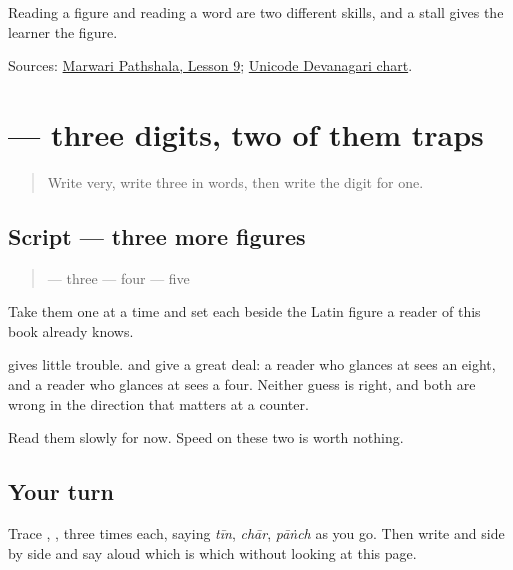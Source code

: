 Reading a figure and reading a word are two different skills, and a stall gives the learner the figure.

\begin{tcolorbox}[breakable,colback=teal!4,colframe=teal!35!black,title={Before you move on}]
Sources: \href{https://www.marwaripathshala.com/marwari-lesson-9-english}{Marwari Pathshala, Lesson 9}; \href{https://www.unicode.org/charts/PDF/U0900.pdf}{Unicode Devanagari chart}.
\end{tcolorbox}
\section[\texorpdfstring{\mw{३} \mw{४} \mw{५} (3 4 5)}{३ ४ ५ (3 4 5)}]{   — three digits, two of them traps}

\label{lesson:MW-W35-digits-three-four-five}



\begin{quote}
Write very, write three in words, then write the digit for one.
\end{quote}

\subsection*{Script — three more figures}
\begin{quote}
\textbf{} — three  \textbf{} — four  \textbf{} — five
\end{quote}

Take them one at a time and set each beside the Latin figure a reader of this book already knows.

\textbf{} gives little trouble. \textbf{} and \textbf{} give a great deal: a reader who glances at \textbf{} sees an eight, and a reader who glances at \textbf{} sees a four. Neither guess is right, and both are wrong in the direction that matters at a counter.

Read them slowly for now. Speed on these two is worth nothing.

\subsection*{Your turn}
Trace \textbf{}, \textbf{}, \textbf{} three times each, saying \emph{tīn}, \emph{chār}, \emph{pāṅch} as you go. Then write \textbf{} and \textbf{} side by side and say aloud which is which without looking at this page.

